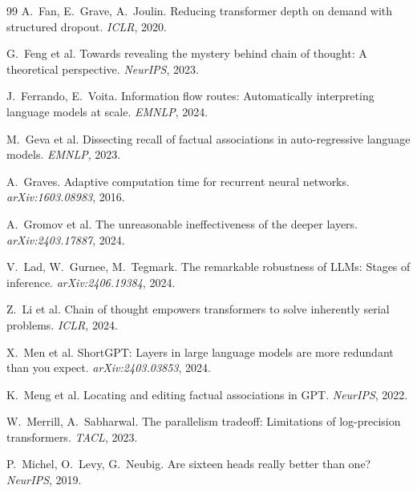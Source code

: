 \documentclass[11pt]{article}
\begin{document}
\begin{thebibliography}{99}
A.~Fan, E.~Grave, A.~Joulin.
\newblock Reducing transformer depth on demand with structured dropout.
\newblock \emph{ICLR}, 2020.

G.~Feng et al.
\newblock Towards revealing the mystery behind chain of thought: A theoretical
perspective.
\newblock \emph{NeurIPS}, 2023.

J.~Ferrando, E.~Voita.
\newblock Information flow routes: Automatically interpreting language models at
scale.
\newblock \emph{EMNLP}, 2024.

M.~Geva et al.
\newblock Dissecting recall of factual associations in auto-regressive language
models.
\newblock \emph{EMNLP}, 2023.

A.~Graves.
\newblock Adaptive computation time for recurrent neural networks.
\newblock \emph{arXiv:1603.08983}, 2016.

A.~Gromov et al.
\newblock The unreasonable ineffectiveness of the deeper layers.
\newblock \emph{arXiv:2403.17887}, 2024.

V.~Lad, W.~Gurnee, M.~Tegmark.
\newblock The remarkable robustness of LLMs: Stages of inference.
\newblock \emph{arXiv:2406.19384}, 2024.

Z.~Li et al.
\newblock Chain of thought empowers transformers to solve inherently serial
problems.
\newblock \emph{ICLR}, 2024.

X.~Men et al.
\newblock ShortGPT: Layers in large language models are more redundant than you
expect.
\newblock \emph{arXiv:2403.03853}, 2024.

K.~Meng et al.
\newblock Locating and editing factual associations in GPT.
\newblock \emph{NeurIPS}, 2022.

W.~Merrill, A.~Sabharwal.
\newblock The parallelism tradeoff: Limitations of log-precision transformers.
\newblock \emph{TACL}, 2023.

P.~Michel, O.~Levy, G.~Neubig.
\newblock Are sixteen heads really better than one?
\newblock \emph{NeurIPS}, 2019.


\end{thebibliography}
\end{document}
